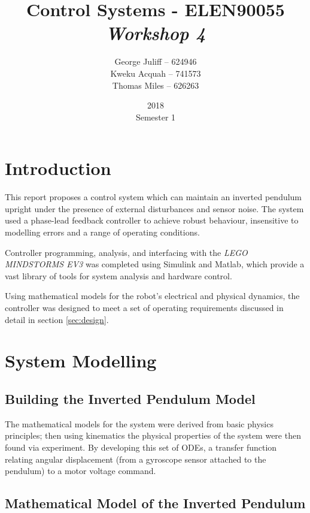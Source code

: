 \documentclass[11pt, a4paper,twocolumn]{article}
\title{\textbf{Control Systems - ELEN90055} \\ \textit{Workshop 4}}
\date{2018\\ Semester 1}
\author{George Juliff -- 624946\\ Kweku Acquah -- 741573\\Thomas Miles -- 626263}
\begin{document}
\maketitle
{}
\clearpage
{}
\section{Introduction}\label{sec:intro}
\quad This report proposes a control system which can maintain an inverted pendulum upright under the presence of external disturbances and sensor noise. The system used a phase-lead feedback controller to achieve robust behaviour, insensitive to modelling errors and a range of operating conditions.

Controller programming, analysis, and interfacing with the \textit{LEGO MINDSTORMS EV3} was completed using Simulink and Matlab, which provide a vast library of tools for system analysis and hardware control. 

Using mathematical models for the robot's electrical and physical dynamics, the controller was designed to meet a set of operating requirements discussed in detail in section \ref{sec:design}.
\section{	System Modelling	}\label{sec:model}
\subsection{	Building the Inverted Pendulum Model	}
\quad The mathematical models for the system were derived from basic physics principles; then using kinematics the physical properties of the system were then found via experiment.
By developing this set of ODEs, a transfer function relating angular displacement (from a gyroscope sensor attached to the  pendulum) to a motor voltage command.

\subsection{	Mathematical Model of the Inverted Pendulum		}
\end{document}
